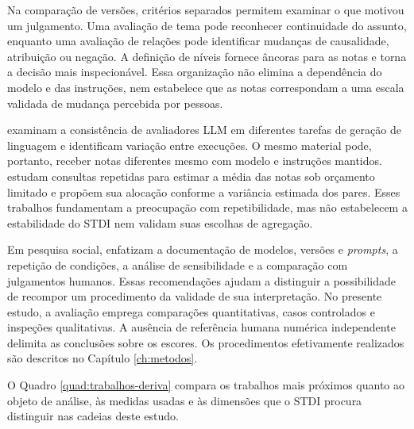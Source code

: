 Na comparação de versões, critérios separados permitem examinar o que motivou um julgamento. Uma avaliação de tema pode reconhecer continuidade do assunto, enquanto uma avaliação de relações pode identificar mudanças de causalidade, atribuição ou negação. A definição de níveis fornece âncoras para as notas e torna a decisão mais inspecionável. Essa organização não elimina a dependência do modelo e das instruções, nem estabelece que as notas correspondam a uma escala validada de mudança percebida por pessoas.

 examinam a consistência de avaliadores LLM em diferentes tarefas de geração de linguagem e identificam variação entre execuções. O mesmo material pode, portanto, receber notas diferentes mesmo com modelo e instruções mantidos.  estudam consultas repetidas para estimar a média das notas sob orçamento limitado e propõem sua alocação conforme a variância estimada dos pares. Esses trabalhos fundamentam a preocupação com repetibilidade, mas não estabelecem a estabilidade do STDI nem validam suas escolhas de agregação.

Em pesquisa social,  enfatizam a documentação de modelos, versões e \textit{prompts}, a repetição de condições, a análise de sensibilidade e a comparação com julgamentos humanos. Essas recomendações ajudam a distinguir a possibilidade de recompor um procedimento da validade de sua interpretação. No presente estudo, a avaliação emprega comparações quantitativas, casos controlados e inspeções qualitativas. A ausência de referência humana numérica independente delimita as conclusões sobre os escores. Os procedimentos efetivamente realizados são descritos no Capítulo \ref{ch:metodos}.

O Quadro \ref{quad:trabalhos-deriva} compara os trabalhos mais próximos quanto ao objeto de análise, às medidas usadas e às dimensões que o STDI procura distinguir nas cadeias deste estudo.


